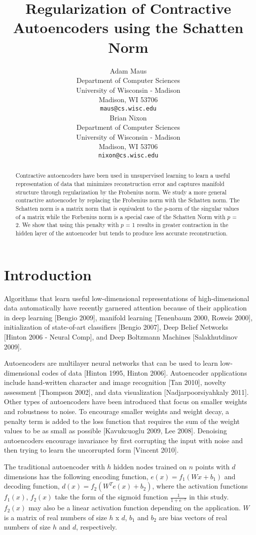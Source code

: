 \documentclass{article} %
\title{Regularization of Contractive Autoencoders using the Schatten Norm}
\author{
Adam Maus \\ 
Department of Computer Sciences \\
University of Wisconsin - Madison \\
Madison, WI 53706 \\
\texttt{maus@cs.wisc.edu} \\
\And
Brian Nixon \\
Department of Computer Sciences \\
University of Wisconsin - Madison \\
Madison, WI 53706 \\
\texttt{nixon@cs.wisc.edu} \\
}
\begin{document}
\maketitle

\begin{abstract}
Contractive autoencoders have been used in unsupervised learning to learn a useful representation of data that minimizes reconstruction error and captures manifold structure through regularization by the Frobenius norm. We study a more general contractive autoencoder by replacing the Frobenius norm with the Schatten norm. The Schatten norm is a matrix norm that is equivalent to the $p$-norm of the singular values of a matrix while the Forbenius norm is a special case of the Schatten Norm with $p$ = 2. We show that using this penalty with $p$ = 1 results in greater contraction in the hidden layer of the autoencoder but tends to produce less accurate reconstruction.
\end{abstract}

\section{Introduction}

Algorithms that learn useful low-dimensional representations of high-dimensional data automatically have recently garnered attention because of their application in deep learning [Bengio 2009], manifold learning [Tenenbaum 2000, Roweis 2000], initialization of state-of-art classifiers [Bengio 2007], Deep Belief Networks [Hinton 2006 - Neural Comp], and Deep Boltzmann Machines [Salakhutdinov 2009]. 

Autoencoders are multilayer neural networks that can be used to learn low-dimensional codes of data [Hinton 1995, Hinton 2006]. Autoencoder applications include hand-written character and image recognition [Tan 2010], novelty assessment [Thompson 2002], and data visualization [Nadjarpoorsiyahkaly 2011]. Other types of autoencoders have been introduced that focus on smaller weights and robustness to noise. To encourage smaller weights and weight decay, a penalty term is added to the loss function that requires the sum of the weight values to be as small as possible [Kavukcuoglu 2009, Lee 2008]. Denoising autoencoders encourage invariance by first corrupting the input with noise and then trying to learn the uncorrupted form [Vincent 2010]. 

The traditional autoencoder with $h$ hidden nodes trained on $n$ points with $d$ dimensions has the following encoding function, $e(x) = f_1(Wx + b_1) $ and decoding function, $d(x) = f_2(W^{T} e(x) + b_2) $, where the activation functions $f_1(x)$, $f_2(x)$ take the form of the sigmoid function $\frac{1}{1 + e^{-x}}$ in this study. $f_2(x)$ may also be a linear activation function depending on the application. $W$ is a matrix of real numbers of size $h$ x $d$, $b_1$ and $b_2$ are bias vectors of real numbers of size $h$ and $d$, respectively.
\end{document}
